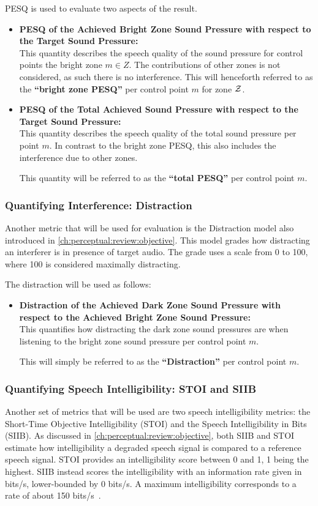 PESQ is used to evaluate two aspects of the result.
\begin{itemize}
    \item \textbf{PESQ of the Achieved Bright Zone Sound Pressure with respect to the Target Sound Pressure:}\\
        This quantity describes the speech quality of the sound pressure for control points the bright zone $m\in Z$.
        The contributions of other zones is not considered, as such there is no interference.
        This will henceforth referred to as the \textbf{``bright zone PESQ''} per control point $m$ for zone $\mathcal{Z}$.
    \item \textbf{PESQ of the Total Achieved Sound Pressure with respect to the Target Sound Pressure:}\\
        This quantity describes the speech quality of the total sound pressure per point $m$.
        In contrast to the bright zone PESQ, this also includes the interference due to other zones.

        This quantity will be referred to as the \textbf{``total PESQ''} per control point $m$. 
\end{itemize}

\subsubsection*{Quantifying Interference: Distraction}
Another metric that will be used for evaluation is the Distraction model also introduced in \autoref{ch:perceptual:review:objective}.
This model grades how distracting an interferer is in presence of target audio.
The grade uses a scale from 0 to 100, where 100 is considered maximally distracting.

The distraction will be used as follows:
\begin{itemize}
    \item \textbf{Distraction of the Achieved Dark Zone Sound Pressure with respect to the Achieved Bright Zone Sound Pressure:}\\
        This quantifies how distracting the dark zone sound pressures are when listening to the bright zone sound pressure per control point $m$. 

        This will simply be referred to as the \textbf{``Distraction''} per control point $m$.
\end{itemize}

\subsubsection*{Quantifying Speech Intelligibility: STOI and SIIB}
Another set of metrics that will be used are two speech intelligibility metrics: the Short-Time Objective Intelligibility (STOI) and 
the Speech Intelligibility in Bits (SIIB).
As discussed in \autoref{ch:perceptual:review:objective}, both SIIB and STOI estimate how intelligibility a degraded speech signal is 
compared to a reference speech signal.
STOI provides an intelligibility score between 0 and 1, 1 being the highest.
SIIB instead scores the intelligibility with an information rate given in bits/s, lower-bounded by 0 bits/s.
A maximum intelligibility corresponds to a rate of about 150 bits/s~\cite{van2017instrumental}.

